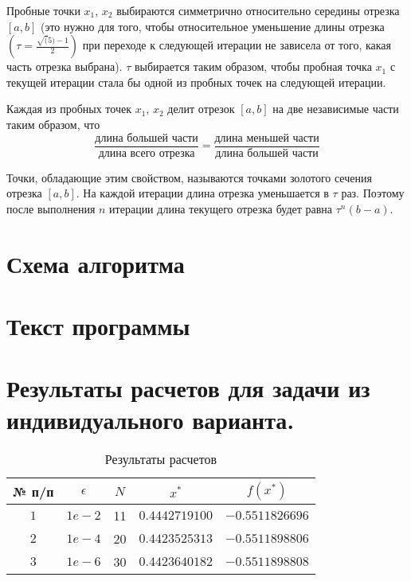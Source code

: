 Пробные точки $x_1$, $x_2$ выбираются симметрично относительно середины отрезка $[a, b]$ (это нужно для того, чтобы относительное уменьшение длины отрезка $(\tau = \frac{\sqrt(5) - 1}{2})$ при переходе к следующей итерации не зависела от того, какая часть отрезка выбрана). $\tau$ выбирается таким образом, чтобы пробная точка $x_1$ с текущей итерации стала бы одной из пробных точек на следующей итерации. 

Каждая из пробных точек $x_1$, $x_2$ делит отрезок $[a, b]$ на две независимые части таким образом, что 
\begin{equation*}
\frac{\text{длина большей части}}{\text{длина всего отрезка}} = \frac{\text{длина меньшей части}}{\text{длина большей части}}
\end{equation*}

Точки, обладающие этим свойством, называются точками золотого сечения отрезка $[a, b]$. На каждой итерации длина отрезка уменьшается в $\tau$ раз. Поэтому после выполнения $n$ итерации длина текущего отрезка будет равна $\tau^n(b - a)$.

\section{Схема алгоритма}


\section{Текст программы}


\section{Результаты расчетов для задачи из индивидуального варианта.}

\begin{table}[h]
    \centering
    \small
    \caption{Результаты расчетов }
    \label{tbl:cmp}

    \begin{tabular}{|c|c|c|c|c|}
        \hline
        № п/п & $\epsilon$ & $N$ & $x^*$ & $f(x^*)$ \\\hline
        $1$ & $1e-2$ & 11 & $0.4442719100$ & $-0.5511826696$ \\\hline
        $2$ & $1e-4$ & 20 & $0.4423525313$ & $-0.5511898806$ \\\hline
        $3$ & $1e-6$ & 30 & $0.4423640182$ & $-0.5511898808$ \\\hline
    \end{tabular}
\end{table}